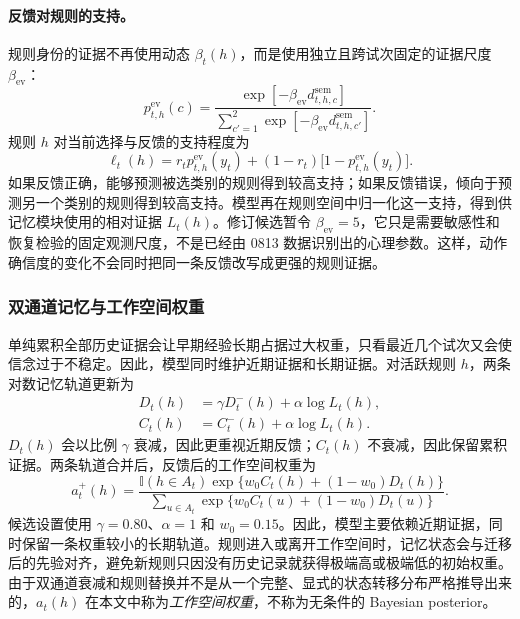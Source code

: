 \paragraph{反馈对规则的支持。}
规则身份的证据不再使用动态 $\beta_t(h)$，而是使用独立且跨试次固定的证据尺度 $\beta_{\mathrm{ev}}$：
\begin{equation}
p^{\mathrm{ev}}_{t,h}(c)
=
\frac{\exp[-\beta_{\mathrm{ev}}d^{\mathrm{sem}}_{t,h,c}]}
{\sum_{c'=1}^{2}\exp[-\beta_{\mathrm{ev}}d^{\mathrm{sem}}_{t,h,c'}]}.
\label{eq:dynamic-rule-evidence-emission}
\end{equation}
规则 $h$ 对当前选择与反馈的支持程度为
\begin{equation}
\ell_t(h)
=r_tp^{\mathrm{ev}}_{t,h}(y_t)
+(1-r_t)\bigl[1-p^{\mathrm{ev}}_{t,h}(y_t)\bigr].
\label{eq:dynamic-feedback-support}
\end{equation}
如果反馈正确，能够预测被选类别的规则得到较高支持；如果反馈错误，倾向于预测另一个类别的规则得到较高支持。模型再在规则空间中归一化这一支持，得到供记忆模块使用的相对证据 $L_t(h)$。修订候选暂令 $\beta_{\mathrm{ev}}=5$，它只是需要敏感性和恢复检验的固定观测尺度，不是已经由 0813 数据识别出的心理参数。这样，动作确信度的变化不会同时把同一条反馈改写成更强的规则证据。


\subsubsection{双通道记忆与工作空间权重}

单纯累积全部历史证据会让早期经验长期占据过大权重，只看最近几个试次又会使信念过于不稳定。因此，模型同时维护近期证据和长期证据。对活跃规则 $h$，两条对数记忆轨道更新为
\begin{align}
D_t(h)
&=\gamma D_t^{-}(h)+\alpha\log L_t(h),
\nonumber\\
C_t(h)
&=C_t^{-}(h)+\alpha\log L_t(h).
\label{eq:dynamic-dual-memory}
\end{align}
$D_t(h)$ 会以比例 $\gamma$ 衰减，因此更重视近期反馈；$C_t(h)$ 不衰减，因此保留累积证据。两条轨道合并后，反馈后的工作空间权重为
\begin{equation}
a_t^{+}(h)
=
\frac{\mathbb I(h\in A_t)
\exp\{w_0C_t(h)+(1-w_0)D_t(h)\}}
{\sum_{u\in A_t}
\exp\{w_0C_t(u)+(1-w_0)D_t(u)\}}.
\label{eq:dynamic-memory-posterior}
\end{equation}
候选设置使用 $\gamma=0.80$、$\alpha=1$ 和 $w_0=0.15$。因此，模型主要依赖近期证据，同时保留一条权重较小的长期轨道。规则进入或离开工作空间时，记忆状态会与迁移后的先验对齐，避免新规则只因没有历史记录就获得极端高或极端低的初始权重。由于双通道衰减和规则替换并不是从一个完整、显式的状态转移分布严格推导出来的，$a_t(h)$ 在本文中称为\emph{工作空间权重}，不称为无条件的 Bayesian posterior。


